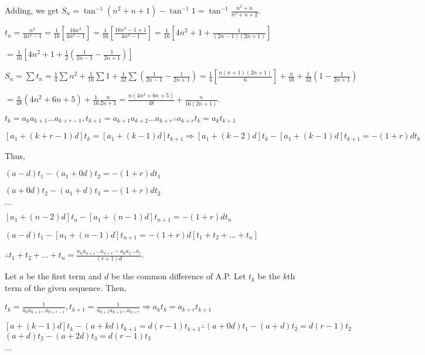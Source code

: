   Adding, we get $S_n = \tan^{-1}(n^2 + n + 1) - \tan^{-1}1 = \tan^{-1}\frac{n^2 + n}{n^2 + n + 2}$.
\item $t_n = \frac{n^4}{4n^2 - 1} = \frac{1}{16}\left[\frac{16n^4}{4n^2 - 1}\right] =
  \frac{1}{16}\left[\frac{16n^4 - 1 + 1}{4n^2 - 1}\right] = \frac{1}{16}\left[4n^2 + 1 + \frac{1}{(2n -
    1)(2n + 1)}\right]$

  $= \frac{1}{16}\left[4n^2 + 1 + \frac{1}{2}\left(\frac{1}{2n - 1} - \frac{1}{2n + 1}\right)\right]$

  $S_n = \displaystyle\sum t_n = \frac{1}{4}\sum n^2 + \frac{1}{16}\sum 1 + \frac{1}{32}\sum \left(\frac{1}{2n - 1} -
  \frac{1}{2n + 1}\right) = \frac{1}{4}\left[\frac{n(n + 1)(2n + 1)}{6}\right] + \frac{n}{16} +
  \frac{1}{32}\left(1 - \frac{1}{2n + 1}\right)$

  $= \frac{n}{48}(4n^2 + 6n + 5) + \frac{1}{16}\frac{n}{2n + 1} = \frac{n(4n^2 + 6n + 5)}{48} +
  \frac{n}{16(2n + 1)}$.
\item $t_k = a_ka_{k+1}\ldots a_{k + r - 1}, t_{k+1} = a_{k+1}a_{k+2}\ldots a_{k+r} \therefore a_{k+r}t_k =
  a_kt_{k+1}$

  $[a_1 + (k + r - 1)d]t_k = [a_1 + (k - 1)d]t_{k + 1} \Rightarrow [a_1 + (k - 2)d]t_k - [a_1 + (k -
    1)d]t_{k + 1} = -(1 + r)dt_k$

  Thus,

  $(a - d)t_1 - (a_1 + 0d)t_2 = -(1 + r)dt_1$

  $(a + 0d)t_2 - (a_1 + d)t_3 = -(1 + r)dt_2$

  $\ldots$

  $[a_1 + (n - 2)d]t_n - [a_1 + (n - 1)d]t_{n+1} = -(1 + r)dt_n$

  $(a - d)t_1 - [a_1 + (n - 1)d]t_{n + 1} = -(1 + r)d[t_1 + t_2 + \ldots + t_n]$

  $\therefore t_1 + t_2 + \ldots + t_n = \frac{a_na_{n + 1}\ldots a_{n +r} - a_0a_1\ldots a_r}{(r + 1)d}$.
\item Let $a$ be the first term and $d$ be the common difference of A.P. Let $t_k$ be the $k$th term of the given
  sequence. Then,

  $t_k = \frac{1}{a_ka_{k + 1}\ldots a_{k + r - 1}}, t_{k + 1} = \frac{1}{a_{k + 1}a_{k + 2}\ldots a_{k +
      r}} \Rightarrow a_kt_k = a_{k+r}t_{k + 1}$

  $[a + (k - 1)d]t_k - (a + kd)t_{k + 1} = d(r - 1)t_{k + 1} \therefore (a + 0d)t_1 - (a + d)t_2 = d(r - 1)t_2$
  $(a + d)t_2 - (a + 2d)t_3 = d(r - 1)t_3$

  $\ldots$

